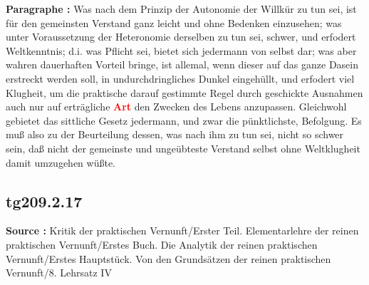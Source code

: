 \documentclass[a4paper,12pt,twoside]{book}
\newcommand{\match}[1]{\textcolor{red}{\textbf{#1}}}
\begin{document}
	\noindent\textbf{Paragraphe : }
	Was nach dem Prinzip der Autonomie der Willkür zu tun sei, ist für den gemeinsten Verstand ganz leicht und ohne Bedenken einzusehen; was unter Voraussetzung der Heteronomie derselben zu tun sei, schwer, und erfodert Weltkenntnis; d.i. was Pflicht sei, bietet sich jedermann von selbst dar; was aber wahren dauerhaften Vorteil bringe, ist allemal, wenn dieser auf das ganze Dasein erstreckt werden soll, in undurchdringliches Dunkel eingehüllt, und erfodert viel Klugheit, um die praktische darauf gestimmte Regel durch geschickte Ausnahmen auch nur auf erträgliche \match{Art} den Zwecken des Lebens anzupassen. Gleichwohl gebietet das sittliche Gesetz jedermann, und zwar die pünktlichste, Befolgung. Es muß also zu der Beurteilung dessen, was nach ihm zu tun sei, nicht so schwer sein, daß nicht der gemeinste und ungeübteste Verstand selbst ohne Weltklugheit damit umzugehen wüßte. 
	
	\subsection*{tg209.2.17} 
	\textbf{Source : }Kritik der praktischen Vernunft/Erster Teil. Elementarlehre der reinen praktischen Vernunft/Erstes Buch. Die Analytik der reinen praktischen Vernunft/Erstes Hauptstück. Von den Grundsätzen der reinen praktischen Vernunft/8. Lehrsatz IV\\  
	
\end{document}
